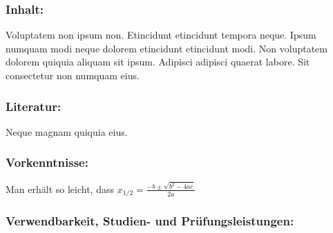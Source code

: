 \subsubsection*{\Large Inhalt:}
Voluptatem non ipsum non. Etincidunt etincidunt tempora neque. Ipsum numquam modi neque dolorem etincidunt etincidunt modi. Non voluptatem dolorem quiquia aliquam sit ipsum. Adipisci adipisci quaerat labore. Sit consectetur non numquam eius.
\subsubsection*{\Large Literatur:}
Neque magnam quiquia eius.
\subsubsection*{\Large Vorkenntnisse:}
Man erhält so leicht, dass $x_{1/2} = \frac{-b \pm \sqrt{b^2 - 4ac}}{2a}$
\subsubsection*{\Large Verwendbarkeit, Studien- und Prüfungsleistungen:}
\begin{tabularx}{\textwidth}{ p{}
    }
    \\[2ex] \hline 
\end{tabularx}

